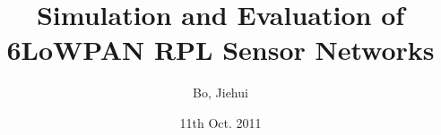 \documentclass[11pt,twoside]{report}
\begin{document}

\title{Simulation and Evaluation of 6LoWPAN RPL Sensor Networks}
\author{Bo, Jiehui}
\date{11th Oct. 2011}
\makecntitle


\cleardoublepage



\tableofcontents












\appendix
%



\listoffigures










\end{document}
